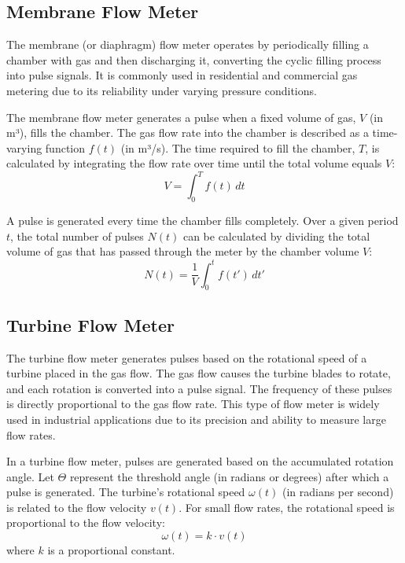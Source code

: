\documentclass[10pt, sigconf]{acmart}
\begin{document}
\subsection{Membrane Flow Meter}

The membrane (or diaphragm) flow meter operates by periodically filling a chamber with gas and then discharging it, converting the cyclic filling process into pulse signals. It is commonly used in residential and commercial gas metering due to its reliability under varying pressure conditions.

The membrane flow meter generates a pulse when a fixed volume of gas, $V$ (in m³), fills the chamber. The gas flow rate into the chamber is described as a time-varying function $f(t)$ (in m³/s). The time required to fill the chamber, $T$, is calculated by integrating the flow rate over time until the total volume equals $V$:
\begin{equation}
   V = \int_{0}^{T} f(t) \, dt
\end{equation}

A pulse is generated every time the chamber fills completely. Over a given period $t$, the total number of pulses $N(t)$ can be calculated by dividing the total volume of gas that has passed through the meter by the chamber volume $V$:
\begin{equation}
   N(t) = \frac{1}{V} \int_{0}^{t} f(t') \, dt'
\end{equation}

\subsection{Turbine Flow Meter}

The turbine flow meter generates pulses based on the rotational speed of a turbine placed in the gas flow. The gas flow causes the turbine blades to rotate, and each rotation is converted into a pulse signal. The frequency of these pulses is directly proportional to the gas flow rate. This type of flow meter is widely used in industrial applications due to its precision and ability to measure large flow rates.

In a turbine flow meter, pulses are generated based on the accumulated rotation angle. Let $\Theta$ represent the threshold angle (in radians or degrees) after which a pulse is generated. The turbine’s rotational speed $\omega(t)$ (in radians per second) is related to the flow velocity $v(t)$. For small flow rates, the rotational speed is proportional to the flow velocity:
\begin{equation}
   \omega(t) = k \cdot v(t)
\end{equation}
where $k$ is a proportional constant.
\end{document}
